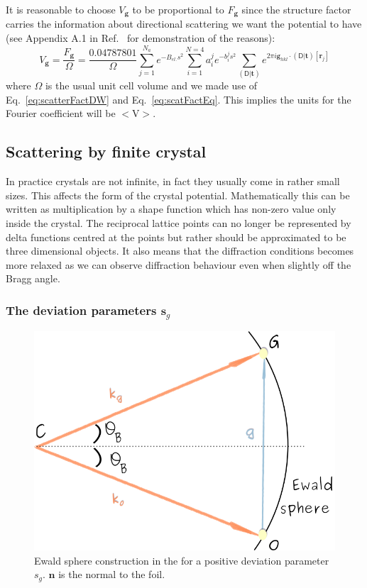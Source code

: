 It is reasonable to choose $V_\mathbf{g}$ to be proportional to $F_\mathbf{g}$ since the structure factor carries the information about directional scattering we want the potential to have (see Appendix A.1 in Ref.~\cite{Rymer70} for demonstration of the reasons):
\begin{equation}
\label{eq:Vg}
    V_\mathbf{g} = \frac{F_\mathbf{g}}{\Omega} = \frac{0.04787801}{\Omega} \sum_{j=1}^{N_a}  e^{-B_{el.} s^2} \sum_{i=1}^{N=4} a^j_i e^{-b^j_i s^2}    \sum_{(\mathsf{D}|\mathbf{t})} e^{2\pi i  \mathbf{g}_{hkl} \cdot (\mathsf{D}|\mathbf{t})[\mathbf{r}_j] }
\end{equation}
 where $\Omega$ is the usual unit cell volume and we made use of Eq.~\ref{eq:scatterFactDW} and Eq.~\ref{eq:scatFactEq}. This implies the units for the Fourier coefficient will be $<$\si{\volt}$>$.
 

\subsection{Scattering by finite crystal}

In practice crystals are not infinite, in fact they usually come in rather small sizes. This affects the form of the crystal potential. Mathematically this can be written as multiplication by a shape function which has non-zero value only inside the crystal. The reciprocal lattice points can no longer be represented by delta functions centred at the points but rather should be approximated to be three dimensional objects.  It also means that the diffraction conditions becomes more relaxed as we can observe diffraction behaviour even when slightly off the Bragg angle.


\subsubsection{The deviation parameters \texorpdfstring{$\mathbf{s}_g$}{sg}}
\label{sec:sg}

\begin{figure}[ht]
    \centering
\includegraphics[width=0.52\linewidth]{Figures/EwaldSpheresg.png}
\caption[Ewald sphere construction in the for a positive deviation parameter $s_g$.]{Ewald sphere construction in the for a positive deviation parameter $s_g$. $\mathbf{n}$ is the normal to the foil. }
\label{Fig:Ewaldsg}
\end{figure}

